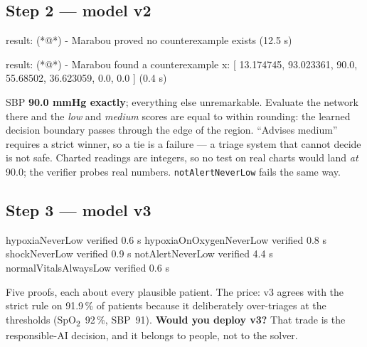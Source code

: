 \documentclass[11pt]{article}
\begin{document}
\subsection*{Step 2 — model v2}
\begin{expected}
    result: (*@\tok@*) - Marabou proved no counterexample exists                              (12.5 s)
\end{expected}
\begin{expected}
    result: (*@\tbad@*) - Marabou found a counterexample
      x: [ 13.174745, 93.023361, 90.0, 55.68502, 36.623059, 0.0, 0.0 ]              (0.4 s)
\end{expected}
SBP \textbf{90.0 mmHg exactly}; everything else unremarkable. Evaluate the network there and the \emph{low} and \emph{medium} scores are equal to within rounding: the learned decision boundary passes through the edge of the region. ``Advises medium'' requires a strict winner, so a tie is a failure — a triage system that cannot decide is not safe. Charted readings are integers, so no test on real charts would land \emph{at} 90.0; the verifier probes real numbers. \texttt{notAlertNeverLow} fails the same way.

\subsection*{Step 3 — model v3}
\begin{expected}
hypoxiaNeverLow            verified   0.6 s
hypoxiaOnOxygenNeverLow    verified   0.8 s
shockNeverLow              verified   0.9 s
notAlertNeverLow           verified   4.4 s
normalVitalsAlwaysLow      verified   0.6 s
\end{expected}
\verified\quad Five proofs, each about every plausible patient. The price: v3 agrees with the strict rule on 91.9\,\% of patients because it deliberately over-triages at the thresholds (SpO\textsubscript{2}~92\,\%, SBP~91). \textbf{Would you deploy v3?} That trade is the responsible-AI decision, and it belongs to people, not to the solver.
\end{document}
